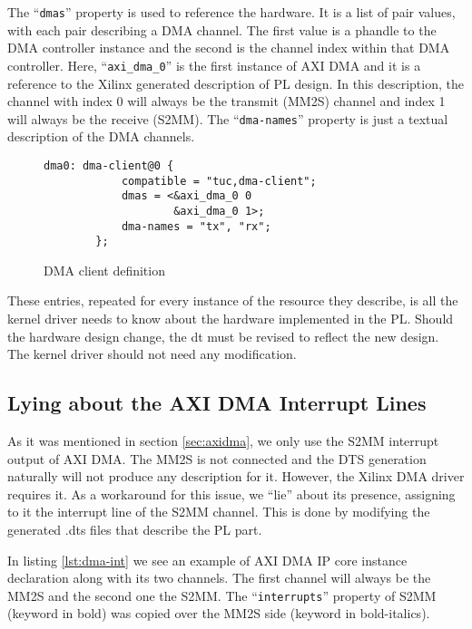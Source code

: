 The ``\texttt{dmas}'' property is used to reference the hardware.
It is a list of pair values, with each pair describing a DMA channel.
The first value is a phandle to the DMA controller instance
and the second is the channel index within that DMA controller.
Here, ``\texttt{axi\_dma\_0}'' is the first instance of AXI DMA and it is a reference
to the Xilinx generated description of PL design. In this description, the channel with index 0
will always be the transmit (MM2S) channel and index 1 will always be the receive (S2MM).
The ``\texttt{dma-names}'' property is just a textual description of the DMA channels.

\begin{figure}[ht!]
\centering
\begin{lstlisting}[style=basic]
		dma0: dma-client@0 {
			compatible = "tuc,dma-client";
			dmas = <&axi_dma_0 0
					&axi_dma_0 1>;
			dma-names = "tx", "rx";
		};
\end{lstlisting}
\caption{DMA client definition}
\label{lst:dmaclient}
\end{figure}

These entries, repeated for every instance of the resource they describe, is all the kernel driver
needs to know about the hardware implemented in the PL.
Should the hardware design change, the \gls{dt} must be revised to reflect the new design.
The kernel driver should not need any modification.

\subsection{Lying about the AXI DMA Interrupt Lines}

As it was mentioned in section \ref{sec:axidma}, we only use the S2MM interrupt output of AXI DMA.
The MM2S is not connected and the DTS generation naturally will not produce any description for it.
However, the Xilinx DMA driver requires it. As a workaround for this issue, we ``lie'' about its presence,
assigning to it the interrupt line of the S2MM channel. This is done by modifying the generated .dts files
that describe the PL part.

In listing \ref{lst:dma-int} we see an example of AXI DMA IP core
instance declaration along with its two channels.
The first channel will always be the MM2S and the second one the S2MM.
The ``\texttt{interrupts}'' property of S2MM (keyword in bold) was copied over
the MM2S side (keyword in bold-italics).

